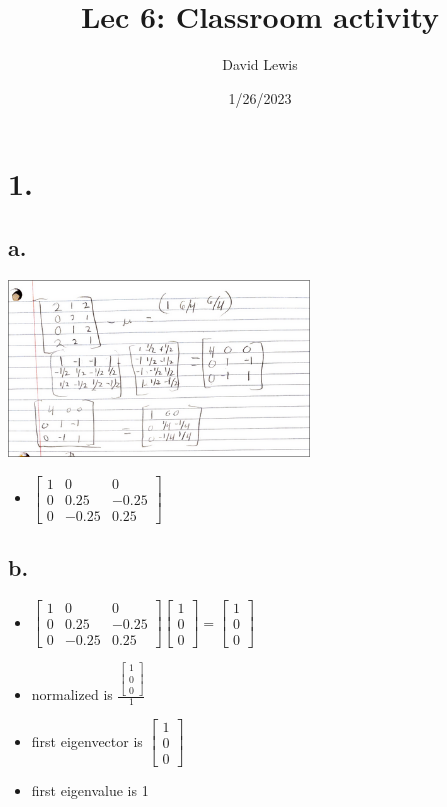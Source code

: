 \documentclass[11pt]{article}
\author{David Lewis}
\date{1/26/2023}
\title{Lec 6: Classroom activity}
\begin{document}
\maketitle
\section*{1.}
\label{sec:org768e5ad}
\subsection*{a.}
\label{sec:orge6d7b7a}
\begin{center}
\includegraphics[width=8cm]{a.png}
\end{center}
\begin{itemize}
\item \(\begin{bmatrix} 1 & 0 & 0 \\
                    0 & 0.25 & -0.25 \\
                    0 & -0.25 & 0.25 \end{bmatrix}\)
\end{itemize}
\subsection*{b.}
\label{sec:orgf6d1829}
\begin{itemize}
\item \(\begin{bmatrix} 1 & 0 & 0 \\
                    0 & 0.25 & -0.25 \\
                    0 & -0.25 & 0.25 \end{bmatrix} \begin{bmatrix}1 \\ 0 \\ 0
  \end{bmatrix} = \begin{bmatrix}1 \\ 0 \\ 0
  \end{bmatrix}\)
\item normalized is \(\frac{ \begin{bmatrix}1 \\ 0 \\ 0
  \end{bmatrix}} {1}\)
\item first eigenvector is \(\begin{bmatrix}1 \\ 0 \\ 0
  \end{bmatrix}\)
\item first eigenvalue is 1
\end{itemize}
\end{document}
